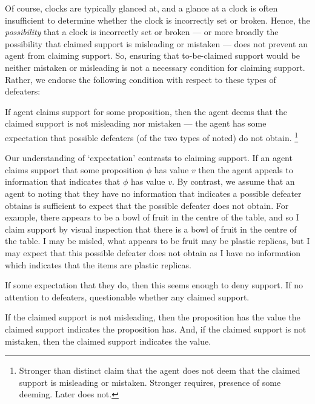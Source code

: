 \begin{note}
  Of course, clocks are typically glanced at, and a glance at a clock is often insufficient to determine whether the clock is incorrectly set or broken.
  Hence, the \emph{possibility} that a clock is incorrectly set or broken --- or more broadly the possibility that claimed support is misleading or mistaken --- does not prevent an agent from claiming support.
  So, ensuring that to-be-claimed support would be neither mistaken or misleading is not a necessary condition for claiming support.
  Rather, we endorse the following condition with respect to these types of defeaters:

  \begin{proposition}\label{prop:CSNMORM}
    If agent claims support for some proposition, then
    the agent deems that the claimed support
    is not misleading nor mistaken --- the agent has some expectation that possible defeaters (of the two types of noted) do not obtain.\nolinebreak
    \footnote{
      Stronger than distinct claim that the agent does not deem that the claimed support is misleading or mistaken.
      Stronger requires, presence of some deeming.
      Later does not.
    }
  \end{proposition}
  Our understanding of `expectation' contrasts to claiming support.
  If an agent claims support that some proposition \(\phi\) has value \(v\) then the agent appeals to information that indicates that \(\phi\) has value \(v\).
  By contrast, we assume that an agent to noting that they have no information that indicates a possible defeater obtains is sufficient to expect that the possible defeater does not obtain.
  For example, there appears to be a bowl of fruit in the centre of the table, and so I claim support by visual inspection that there is a bowl of fruit in the centre of the table.
  I may be misled, what appears to be fruit may be plastic replicas, but I may expect that this possible defeater does not obtain as I have no information which indicates that the items are plastic replicas.

  If some expectation that they do, then this seems enough to deny support.
  If no attention to defeaters, questionable whether any claimed support.

  If the claimed support is not misleading, then the proposition has the value the claimed support indicates the proposition has.
  And, if the claimed support is not mistaken, then the claimed support indicates the value.
\end{note}

